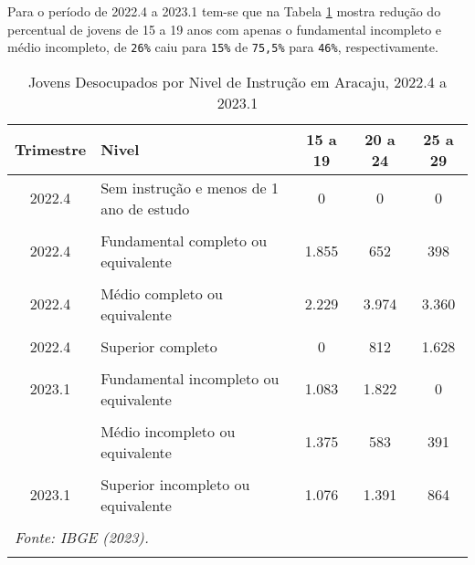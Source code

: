 \documentclass[preprint, 3p,
authoryear]{elsarticle} %
\begin{document}
Para o período de 2022.4 a 2023.1 tem-se que na Tabela \ref{tab9} mostra
redução do percentual de jovens de 15 a 19 anos com apenas o fundamental
incompleto e médio incompleto, de \texttt{26\%} caiu para \texttt{15\%}
de \texttt{75,5\%} para \texttt{46\%}, respectivamente. \newpage
\begingroup\fontsize{9}{11}\selectfont

\begin{longtable}[t]{clccc}
\caption{\label{tab:tab9}\label{tab9}Jovens Desocupados por Nivel de Instrução em Aracaju, 2022.4 a 2023.1}\\
\toprule
Trimestre & Nivel & 15 a 19 & 20 a 24 & 25 a 29\\
\midrule
2022.4 & Sem instrução e menos de 1 ano de estudo & 0 & 0 & 0\\
\cellcolor[HTML]{DCDCDC}{2022.4} & \cellcolor[HTML]{DCDCDC}{Fundamental incompleto ou equivalente} & \cellcolor[HTML]{DCDCDC}{2.389} & \cellcolor[HTML]{DCDCDC}{1.159} & \cellcolor[HTML]{DCDCDC}{363}\\
2022.4 & Fundamental completo ou equivalente & 1.855 & 652 & 398\\
\cellcolor[HTML]{DCDCDC}{2022.4} & \cellcolor[HTML]{DCDCDC}{Médio incompleto ou equivalente} & \cellcolor[HTML]{DCDCDC}{2.610} & \cellcolor[HTML]{DCDCDC}{798} & \cellcolor[HTML]{DCDCDC}{868}\\
2022.4 & Médio completo ou equivalente & 2.229 & 3.974 & 3.360\\
\addlinespace
\cellcolor[HTML]{DCDCDC}{2022.4} & \cellcolor[HTML]{DCDCDC}{Superior incompleto ou equivalente} & \cellcolor[HTML]{DCDCDC}{0} & \cellcolor[HTML]{DCDCDC}{3.225} & \cellcolor[HTML]{DCDCDC}{2.369}\\
2022.4 & Superior completo & 0 & 812 & 1.628\\
\cellcolor[HTML]{DCDCDC}{2023.1} & \cellcolor[HTML]{DCDCDC}{Sem instrução e menos de 1 ano de estudo} & \cellcolor[HTML]{DCDCDC}{0} & \cellcolor[HTML]{DCDCDC}{873} & \cellcolor[HTML]{DCDCDC}{0}\\
2023.1 & Fundamental incompleto ou equivalente & 1.083 & 1.822 & 0\\
\cellcolor[HTML]{DCDCDC}{2023.1} & \cellcolor[HTML]{DCDCDC}{Fundamental completo ou equivalente} & \cellcolor[HTML]{DCDCDC}{885} & \cellcolor[HTML]{DCDCDC}{0} & \cellcolor[HTML]{DCDCDC}{0}\\
\addlinespace
2023.1 & Médio incompleto ou equivalente & 1.375 & 583 & 391\\
\cellcolor[HTML]{DCDCDC}{2023.1} & \cellcolor[HTML]{DCDCDC}{Médio completo ou equivalente} & \cellcolor[HTML]{DCDCDC}{2.855} & \cellcolor[HTML]{DCDCDC}{3.359} & \cellcolor[HTML]{DCDCDC}{2.817}\\
2023.1 & Superior incompleto ou equivalente & 1.076 & 1.391 & 864\\
\cellcolor[HTML]{DCDCDC}{2023.1} & \cellcolor[HTML]{DCDCDC}{Superior completo} & \cellcolor[HTML]{DCDCDC}{0} & \cellcolor[HTML]{DCDCDC}{149} & \cellcolor[HTML]{DCDCDC}{926}\\
\bottomrule
\multicolumn{5}{l}{\rule{0pt}{1em}\textit{Fonte: IBGE (2023).}}\\
\multicolumn{5}{l}{\rule{0pt}{1em}}\\
\end{longtable}
\endgroup{}
\end{document}
